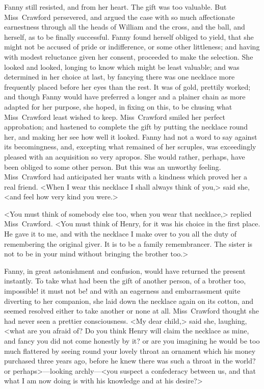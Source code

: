 Fanny still resisted, and from her heart. The gift was too valuable. But Miss~Crawford persevered, and argued the case with so much affectionate earnestness through all the heads of William and the cross, and the ball, and herself, as to be finally successful. Fanny found herself obliged to yield, that she might not be accused of pride or indifference, or some other littleness; and having with modest reluctance given her consent, proceeded to make the selection. She looked and looked, longing to know which might be least valuable; and was determined in her choice at last, by fancying there was one necklace more frequently placed before her eyes than the rest. It was of gold, prettily worked; and though Fanny would have preferred a longer and a plainer chain as more adapted for her purpose, she hoped, in fixing on this, to be chusing what Miss~Crawford least wished to keep. Miss~Crawford smiled her perfect approbation; and hastened to complete the gift by putting the necklace round her, and making her see how well it looked. Fanny had not a word to say against its becomingness, and, excepting what remained of her scruples, was exceedingly pleased with an acquisition so very apropos. She would rather, perhaps, have been obliged to some other person. But this was an unworthy feeling. Miss~Crawford had anticipated her wants with a kindness which proved her a real friend. <When I wear this necklace I shall always think of you,> said she, <and feel how very kind you were.>

<You must think of somebody else too, when you wear that necklace,> replied Miss~Crawford. <You must think of Henry, for it was his choice in the first place. He gave it to me, and with the necklace I make over to you all the duty of remembering the original giver. It is to be a family remembrancer. The sister is not to be in your mind without bringing the brother too.>

Fanny, in great astonishment and confusion, would have returned the present instantly. To take what had been the gift of another person, of a brother too, impossible! it must not be! and with an eagerness and embarrassment quite diverting to her companion, she laid down the necklace again on its cotton, and seemed resolved either to take another or none at all. Miss~Crawford thought she had never seen a prettier consciousness. <My dear child,> said she, laughing, <what are you afraid of? Do you think Henry will claim the necklace as mine, and fancy you did not come honestly by it? or are you imagining he would be too much flattered by seeing round your lovely throat an ornament which his money purchased three years ago, before he knew there was such a throat in the world? or perhaps>—looking archly—<you suspect a confederacy between us, and that what I am now doing is with his knowledge and at his desire?>

